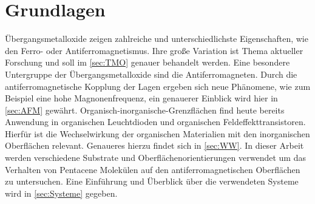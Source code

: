 \chapter{Grundlagen}
    Übergangsmetalloxide zeigen zahlreiche und unterschiedlichste Eigenschaften, wie den Ferro- oder Antiferromagnetismus.
    Ihre große Variation ist Thema aktueller Forschung und soll im \autoref{sec:TMO} genauer behandelt werden.
    Eine besondere Untergruppe der Übergangsmetalloxide sind die Antiferromagneten.
    Durch die antiferromagnetische Kopplung der Lagen ergeben sich neue Phänomene, wie zum Beispiel eine hohe Magnonenfrequenz, ein genauerer Einblick wird hier in \autoref{sec:AFM} gewährt.
    Organisch-inorganische-Grenzflächen find heute bereits Anwendung in organischen Leuchtdioden und organischen Feldeffekttransistoren.
    Hierfür ist die Wechselwirkung der organischen Materialien mit den inorganischen Oberflächen relevant.
    Genaueres hierzu findet sich in \autoref{sec:WW}.
    In dieser Arbeit werden verschiedene Substrate und Oberflächenorientierungen verwendet um das Verhalten von Pentacene Molekülen auf den antiferromagnetischen Oberflächen zu untersuchen.
    Eine Einführung und Überblick über die verwendeten Systeme wird in \autoref{sec:Systeme} gegeben.
    


